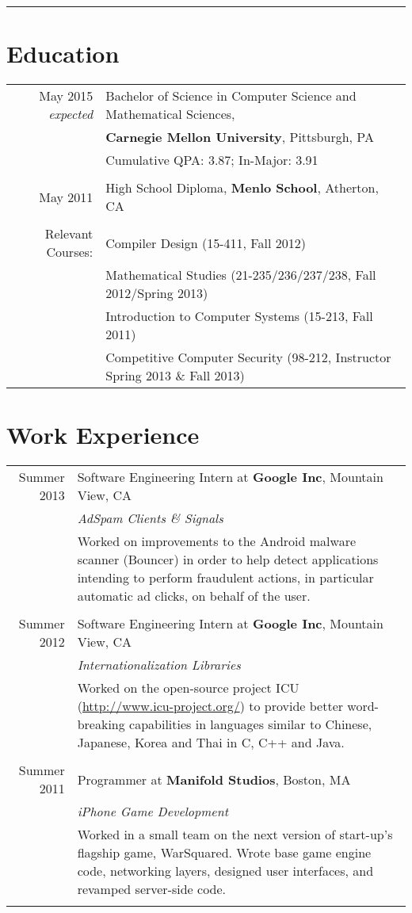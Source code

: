 \documentclass{article}
\newcommand{\job}[6]{#1 & #2 at \textbf{#3}, #4\\ & \emph{#5}\\& \footnotesize{#6}\\
    \multicolumn{2}{c}{}\\ }
\begin{document}
\pagestyle{empty}
\par{\bigskip\par}
\hrule
\par{\par}

\section{Education}
\begin{tabular}{rl}
May 2015 {\em expected} & Bachelor of Science in Computer Science and Mathematical Sciences, 
\\ & \textbf{Carnegie Mellon University}, Pittsburgh, PA\\
& Cumulative QPA: 3.87; In-Major: 3.91 \\ &\\
May 2011 & High School Diploma, \textbf{Menlo School}, Atherton, CA\\ &\\
Relevant Courses: & Compiler Design (15-411, Fall 2012) \\
& Mathematical Studies (21-235/236/237/238, Fall 2012/Spring 2013) \\
& Introduction to Computer Systems (15-213, Fall 2011) \\
& Competitive Computer Security (98-212, Instructor Spring 2013 \& Fall 2013)\end{tabular}

\section{Work Experience}
\begin{tabular}{r|p{}}
\job{Summer 2013}{Software Engineering Intern}{Google Inc}{Mountain View, CA}
{AdSpam Clients \& Signals}
{Worked on improvements to the Android malware scanner (Bouncer) in order to help detect
applications intending to perform fraudulent actions, in particular automatic ad clicks, on behalf
of the user.}
\job{Summer 2012}{Software Engineering Intern}{Google Inc}{Mountain View, CA}
{Internationalization Libraries}
{Worked on the open-source project ICU (\url{http://www.icu-project.org/}) to provide better
word-breaking capabilities in languages similar to Chinese, Japanese, Korea and Thai in C, C++ and
Java.}
\job{Summer 2011}{Programmer}{Manifold Studios}{Boston, MA}{iPhone Game Development}
{Worked in a small team on the next version of start-up's flagship game, WarSquared. Wrote base
game engine code, networking layers, designed user interfaces,
and revamped server-side code.}
\end{tabular}
\end{document}
